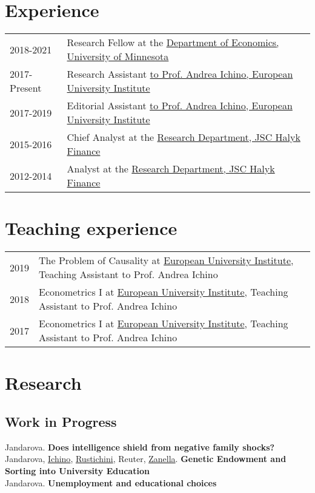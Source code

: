 \documentclass[a4, 11pt]{article}
\begin{document}
    \section*{Experience}
  \begin{table}[H]
      \begin{tabular}{p{2cm}p{14cm}}
          2018-2021 & Research Fellow at the \href{https://cla.umn.edu/economics}{Department of Economics, University of Minnesota} \\
          2017-Present & Research Assistant \href{https://www.eui.eu}{to Prof. Andrea Ichino, European University Institute} \\
          2017-2019 & Editorial Assistant \href{https://www.eui.eu}{to Prof. Andrea Ichino, European University Institute} \\
          2015-2016 & Chief Analyst at the \href{https://www.halykfinance.kz}{Research Department, JSC Halyk Finance} \\
          2012-2014 & Analyst at the \href{https://www.halykfinance.kz}{Research Department, JSC Halyk Finance} \\
      \end{tabular}
    \end{table}


    \section*{Teaching experience}
  \begin{table}[H]
      \begin{tabular}{p{2cm}p{14cm}}
          2019 & {The Problem of Causality} at \href{https://www.eui.eu}{European University Institute}, Teaching Assistant to Prof. Andrea Ichino\\
          2018 & {Econometrics I} at \href{https://www.eui.eu}{European University Institute}, Teaching Assistant to Prof. Andrea Ichino\\
          2017 & {Econometrics I} at \href{https://www.eui.eu}{European University Institute}, Teaching Assistant to Prof. Andrea Ichino\\
      \end{tabular}
    \end{table}


    \section*{Research}\subsection*{Work in Progress}
      Jandarova. \textbf{Does intelligence shield from negative family shocks?}\\
      Jandarova, \href{http://www.andreaichino.it}{Ichino}, \href{https://sites.google.com/site/aldorustichini/}{Rustichini}, Reuter, \href{https://sites.google.com/site/giuliozanella/}{Zanella}. \textbf{Genetic Endowment and Sorting into University Education}\\
      Jandarova. \textbf{Unemployment and educational choices}\\
\end{document}
